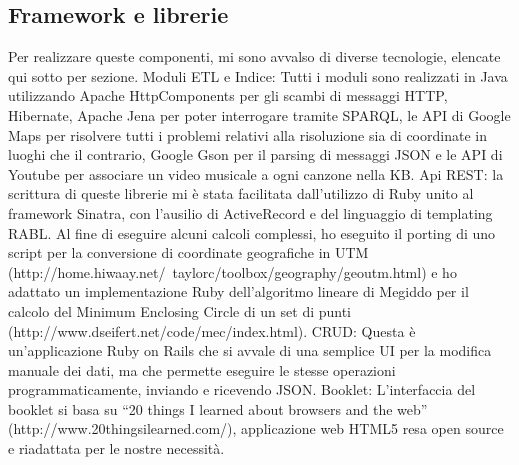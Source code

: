 \documentclass[sigproc-sp.tex]{subfiles}
\begin{document}
\subsection{Framework e librerie}
Per realizzare queste componenti, mi sono avvalso di diverse tecnologie, elencate qui sotto per sezione.
Moduli ETL e Indice: Tutti i moduli sono realizzati in Java utilizzando Apache HttpComponents per gli scambi di messaggi HTTP, Hibernate, Apache Jena per poter interrogare tramite SPARQL, le API di Google Maps per risolvere tutti i problemi relativi alla risoluzione sia di coordinate in luoghi che il contrario, Google Gson per il parsing di messaggi JSON e le API di Youtube per associare un video musicale a ogni canzone nella KB.
Api REST: la scrittura di queste librerie mi è stata facilitata dall’utilizzo di Ruby unito al framework Sinatra, con l’ausilio di ActiveRecord e del linguaggio di templating RABL. Al fine di eseguire alcuni calcoli complessi, ho eseguito il porting di uno script per la conversione di coordinate geografiche in UTM (http://home.hiwaay.net/~taylorc/toolbox/geography/geoutm.html) e ho adattato un implementazione Ruby dell’algoritmo lineare di Megiddo per il calcolo del Minimum Enclosing Circle di un set di punti (http://www.dseifert.net/code/mec/index.html).
CRUD: Questa è un’applicazione Ruby on Rails che si avvale di una semplice UI per la modifica manuale dei dati, ma che permette eseguire le stesse operazioni programmaticamente, inviando e ricevendo JSON.
Booklet: L’interfaccia del booklet si basa su “20 things I learned about browsers and the web” (http://www.20thingsilearned.com/), applicazione web HTML5 resa open source e riadattata per le nostre necessità.
\end{document}
